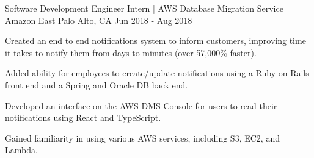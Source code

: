 \begin{cventries}
  \cventry
  {Software Development Engineer Intern | AWS Database Migration Service} %
  {Amazon} %
  {East Palo Alto, CA} %
  {Jun 2018 - Aug 2018} %
  {
    \begin{cvitems} %
      \item {Created an end to end notifications system to inform customers, improving time it takes to notify them from days to minutes (over 57,000\% faster).}
      \item {Added ability for employees to create/update notifications using a Ruby on Rails front end and a Spring and Oracle DB back end.}
      \item {Developed an interface on the AWS DMS Console for users to read their notifications using React and TypeScript.}
      \item {Gained familiarity in using various AWS services, including S3, EC2, and Lambda.}
    \end{cvitems}
  }

\end{cventries}
